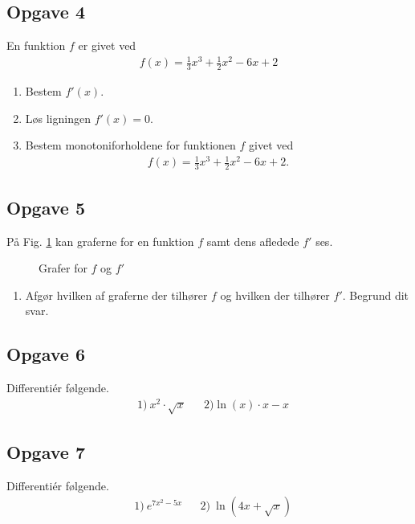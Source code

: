 \subsection*{Opgave 4}
En funktion $f$ er givet ved
\begin{align*}
	f(x) = \frac{1}{3}x^3+\frac{1}{2}x^2-6x+2
\end{align*}
\begin{enumerate}[label=\roman*)]
	\item Bestem $f'(x)$.
	\item Løs ligningen $f'(x) = 0$.
	\item Bestem monotoniforholdene for funktionen $f$ givet ved
	\begin{align*}
		f(x) = \frac{1}{3}x^3 + \frac{1}{2}x^2 -6x +2.
	\end{align*}
\end{enumerate}

\subsection*{Opgave 5}
På Fig. \ref{fig:grafer} kan graferne for en funktion $f$ samt dens afledede $f'$ ses.

\begin{figure}[H]
		\centering
		\caption{Grafer for $f$ og $f'$}
		\label{fig:grafer}
\end{figure}

\begin{enumerate}[label=\roman*)]
	\item Afgør hvilken af graferne der tilhører $f$ og hvilken der tilhører $f'$. Begrund dit svar. 
\end{enumerate}

\subsection*{Opgave 6}
Differentiér følgende.
\begin{align*}
	&1) \ x^2\cdot \sqrt{x}   &&2) \ln(x)\cdot x-x    
\end{align*}

\subsection*{Opgave 7}
Differentiér følgende.
\begin{align*}
	&1) \ e^{7x^2-5x} &&2) \  \ln(4x + \sqrt{x})
\end{align*}

